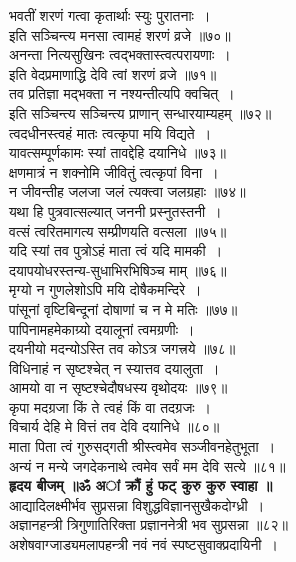 \documentclass[twoside,top=1.7cm, bottom=1.7cm, outer=1cm,landscape, inner=1.5cm,a5paper,]{book}
\begin{document}
\begin{center}
भवतीं शरणं गत्वा कृतार्थाः स्युः पुरातनाः~।\\
इति सञ्चिन्त्य मनसा त्वामहं शरणं व्रजे ॥७०॥\\[10pt]
अनन्ता नित्यसुखिनः त्वद्भक्तास्त्वत्परायणाः~।\\
इति वेदप्रमाणाद्धि देवि त्वां शरणं व्रजे ॥७१॥\\[10pt]
तव प्रतिज्ञा मद्भक्ता न नश्यन्तीत्यपि क्वचित्~।\\
इति सञ्चिन्त्य सञ्चिन्त्य प्राणान् सन्धारयाम्यहम् ॥७२॥\\[10pt]
\newpage
त्वदधीनस्त्वहं मातः त्वत्कृपा मयि विद्यते~।\\
यावत्सम्पूर्णकामः स्यां तावद्देहि दयानिधे ॥७३॥\\[10pt]
क्षणमात्रं न शक्नोमि जीवितुं त्वत्कृपां विना~।\\
न जीवन्तीह जलजा जलं त्यक्त्वा जलग्रहाः ॥७४॥\\[10pt]
यथा हि पुत्रवात्सल्यात् जननी प्रस्नुतस्तनी~।\\
वत्सं त्वरितमागत्य सम्प्रीणयति वत्सला ॥७५॥\\[10pt]
यदि स्यां तव पुत्रोऽहं माता त्वं यदि मामकी~।\\
दयापयोधरस्तन्य-सुधाभिरभिषिञ्च माम् ॥७६॥\\[10pt]
\newpage
मृग्यो न गुणलेशोऽपि मयि दोषैकमन्दिरे~।\\
पांसूनां वृष्टिबिन्दूनां दोषाणां च न मे मतिः ॥७७॥\\[10pt]
पापिनामहमेकाग्र्यो दयालूनां त्वमग्रणीः~।\\
दयनीयो मदन्योऽस्ति तव कोऽत्र जगत्त्रये ॥७८॥\\[10pt]
विधिनाहं न सृष्टश्चेत् न स्यात्तव दयालुता~।\\
आमयो वा न सृष्टश्चेदौषधस्य वृथोदयः ॥७९॥\\[10pt]
कृपा मदग्रजा किं ते त्वहं किं वा तदग्रजः~।\\
विचार्य देहि मे वित्तं तव देवि दयानिधे ॥८०॥\\[10pt]
\newpage
माता पिता त्वं गुरुसद्गती श्रीस्त्वमेव सञ्जीवनहेतुभूता~।\\
अन्यं न मन्ये जगदेकनाथे त्वमेव सर्वं मम देवि सत्ये ॥८१॥\\[10pt]
{\bfseries हृदय बीजम् ॥ॐ अां क्रौं हुं फट् कुरु कुरु स्वाहा ॥}\\[10pt]
आद्यादिलक्ष्मीर्भव सुप्रसन्ना विशुद्धविज्ञानसुखैकदोग्ध्री~।\\
अज्ञानहन्त्री त्रिगुणातिरिक्ता प्रज्ञाननेत्री भव सुप्रसन्ना ॥८२॥\\[10pt]
अशेषवाग्जाड्यमलापहन्त्री नवं नवं स्पष्टसुवाक्प्रदायिनी~।\\

\end{center}
\end{document}
